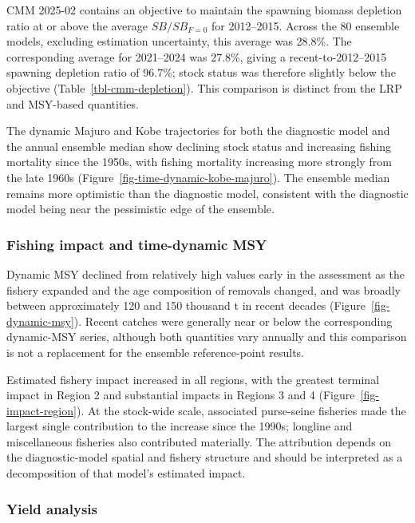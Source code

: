 \documentclass[
  english,
  a4paper,
  a4paper,
  11pt]{SCreport}
\begin{document}
CMM 2025-02 contains an objective to maintain the spawning biomass
depletion ratio at or above the average \(SB/SB_{F=0}\) for 2012--2015.
Across the 80 ensemble models, excluding estimation uncertainty, this
average was 28.8\%. The corresponding average for 2021--2024 was 27.8\%,
giving a recent-to-2012--2015 spawning depletion ratio of 96.7\%; stock
status was therefore slightly below the objective
(Table~\ref{tbl-cmm-depletion}). This comparison is distinct from the
LRP and MSY-based quantities.

The dynamic Majuro and Kobe trajectories for both the diagnostic model
and the annual ensemble median show declining stock status and
increasing fishing mortality since the 1950s, with fishing mortality
increasing more strongly from the late 1960s
(Figure~\ref{fig-time-dynamic-kobe-majuro}). The ensemble median remains
more optimistic than the diagnostic model, consistent with the
diagnostic model being near the pessimistic edge of the ensemble.

\subsubsection{Fishing impact and time-dynamic
MSY}\label{fishing-impact-and-time-dynamic-msy}

Dynamic MSY declined from relatively high values early in the assessment
as the fishery expanded and the age composition of removals changed, and
was broadly between approximately 120 and 150 thousand t in recent
decades (Figure~\ref{fig-dynamic-msy}). Recent catches were generally
near or below the corresponding dynamic-MSY series, although both
quantities vary annually and this comparison is not a replacement for
the ensemble reference-point results.

Estimated fishery impact increased in all regions, with the greatest
terminal impact in Region 2 and substantial impacts in Regions 3 and 4
(Figure~\ref{fig-impact-region}). At the stock-wide scale, associated
purse-seine fisheries made the largest single contribution to the
increase since the 1990s; longline and miscellaneous fisheries also
contributed materially. The attribution depends on the diagnostic-model
spatial and fishery structure and should be interpreted as a
decomposition of that model's estimated impact.

\subsubsection{Yield analysis}\label{yield-analysis}
\end{document}
